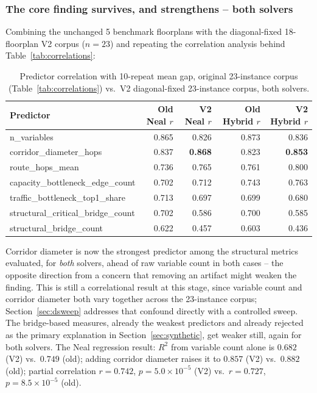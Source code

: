 \documentclass[11pt]{article}
\begin{document}
\subsubsection{The core finding survives, and strengthens -- both solvers}

Combining the unchanged 5 benchmark floorplans with the diagonal-fixed 18-floorplan V2 corpus ($n=23$) and repeating the correlation analysis behind Table~\ref{tab:correlations}:

\begin{table}[h]
\centering
\caption{Predictor correlation with 10-repeat mean gap, original 23-instance corpus (Table~\ref{tab:correlations}) vs.\ V2 diagonal-fixed 23-instance corpus, both solvers.}
\label{tab:v4-correlations}
\small
\begin{tabular}{lrrrr}
\toprule
Predictor & Old Neal $r$ & V2 Neal $r$ & Old Hybrid $r$ & V2 Hybrid $r$ \\
\midrule
n\_variables & 0.865 & 0.826 & 0.873 & 0.836 \\
corridor\_diameter\_hops & 0.837 & \textbf{0.868} & 0.823 & \textbf{0.853} \\
route\_hops\_mean & 0.736 & 0.765 & 0.761 & 0.800 \\
capacity\_bottleneck\_edge\_count & 0.702 & 0.712 & 0.743 & 0.763 \\
traffic\_bottleneck\_top1\_share & 0.713 & 0.697 & 0.699 & 0.680 \\
structural\_critical\_bridge\_count & 0.702 & 0.586 & 0.700 & 0.585 \\
structural\_bridge\_count & 0.622 & 0.457 & 0.603 & 0.436 \\
\bottomrule
\end{tabular}
\end{table}

Corridor diameter is now the strongest predictor among the structural metrics evaluated, for \emph{both} solvers, ahead of raw variable count in both cases -- the opposite direction from a concern that removing an artifact might weaken the finding. This is still a correlational result at this stage, since variable count and corridor diameter both vary together across the 23-instance corpus; Section~\ref{sec:dsweep} addresses that confound directly with a controlled sweep. The bridge-based measures, already the weakest predictors and already rejected as the primary explanation in Section~\ref{sec:synthetic}, get weaker still, again for both solvers. The Neal regression result: $R^2$ from variable count alone is $0.682$ (V2) vs.\ $0.749$ (old); adding corridor diameter raises it to $0.857$ (V2) vs.\ $0.882$ (old); partial correlation $r=0.742$, $p=5.0\times10^{-5}$ (V2) vs.\ $r=0.727$, $p=8.5\times10^{-5}$ (old).
\end{document}
